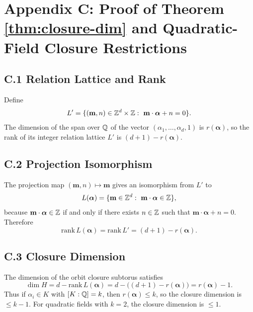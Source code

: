 \section{Appendix C: Proof of Theorem \ref{thm:closure-dim} and Quadratic-Field Closure Restrictions}
\label{app:closure-dim-proof}

\subsection*{C.1 Relation Lattice and Rank}

Define
\[
L'=\{(\mathbf{m},n)\in\ZZ^d\times\ZZ:\ \mathbf{m}\cdot\boldsymbol{\alpha}+n=0\}.
\]
The dimension of the span over $\mathbb{Q}$ of the vector $(\alpha_1,\dots,\alpha_d,1)$ is $r(\boldsymbol{\alpha})$, so the rank of its integer relation lattice $L'$ is $(d+1)-r(\boldsymbol{\alpha})$.

\subsection*{C.2 Projection Isomorphism}

The projection map $(\mathbf{m},n)\mapsto \mathbf{m}$ gives an isomorphism from $L'$ to
\[
L(\boldsymbol{\alpha})=\{\mathbf{m}\in\ZZ^d:\ \mathbf{m}\cdot\boldsymbol{\alpha}\in\ZZ\},
\]
because $\mathbf{m}\cdot\boldsymbol{\alpha}\in\mathbb{Z}$ if and only if there exists $n\in\mathbb{Z}$ such that $\mathbf{m}\cdot\boldsymbol{\alpha}+n=0$. Therefore
\[
\mathrm{rank}\,L(\boldsymbol{\alpha})=\mathrm{rank}\,L'=(d+1)-r(\boldsymbol{\alpha}).
\]

\subsection*{C.3 Closure Dimension}

The dimension of the orbit closure subtorus satisfies
\[
\dim H=d-\mathrm{rank}\,L(\boldsymbol{\alpha})
=d-\bigl((d+1)-r(\boldsymbol{\alpha})\bigr)=r(\boldsymbol{\alpha})-1.
\]
Thus if $\alpha_i\in K$ with $[K:\mathbb{Q}]=k$, then $r(\boldsymbol{\alpha})\le k$, so the closure dimension is $\le k-1$. For quadratic fields with $k=2$, the closure dimension is $\le 1$.
